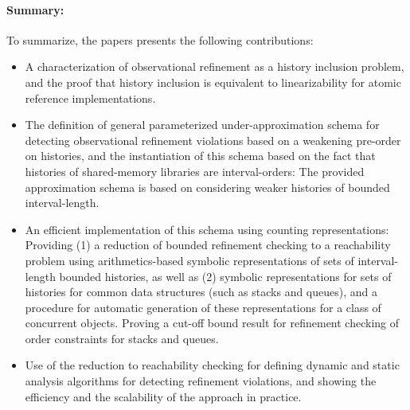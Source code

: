 \paragraph{Summary:}
To summarize, the papers presents the following contributions:

\begin{itemize}
\item
A characterization of observational refinement as a history inclusion problem, and the proof that history inclusion is equivalent to linearizability for atomic reference implementations.

\item 
The definition of general parameterized under-approximation schema for detecting observational refinement violations based on a weakening pre-order on histories, and 
the instantiation of this schema based on the fact that histories of shared-memory libraries are interval-orders: The provided approximation schema is based on considering weaker histories of bounded interval-length.

\item
An efficient implementation of this schema using counting representations: Providing (1) a reduction of bounded refinement checking to a reachability problem  using arithmetics-based symbolic representations of sets of interval-length bounded histories, as well as (2) symbolic representations for sets of histories for common data structures (such as stacks and queues), and a procedure for automatic generation of these representations for a class of concurrent objects.  Proving a cut-off bound result for refinement checking of order constraints for stacks and queues.

\item 
Use of the reduction to reachability checking for defining dynamic and static analysis algorithms for detecting refinement violations, and showing the efficiency and the scalability of the approach in practice.

\end{itemize}
